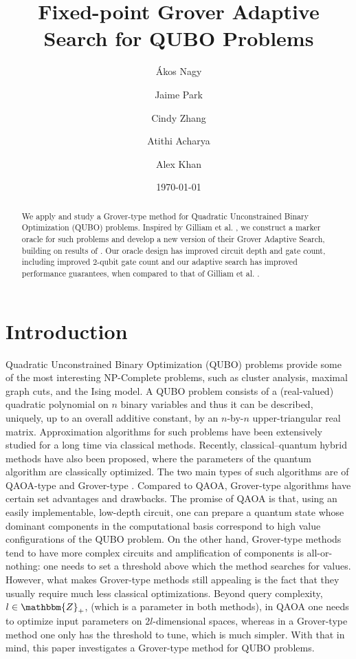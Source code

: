 \documentclass[reqno, 12pt]{amsart}
\title{Fixed-point Grover Adaptive Search for QUBO Problems}
\date{\today}
\author{\'Akos Nagy}
\author{Jaime Park}
\author{Cindy Zhang}
\author{Atithi Acharya}
\author{Alex Khan}
\numberwithin{equation}{section}                %
\def\Z{\mathbbm{Z}}
\begin{document}
\begin{abstract}
   We apply and study a Grover-type method for Quadratic Unconstrained Binary Optimization (QUBO) problems. Inspired by Gilliam et al. \cite{gilliam_grover_2021}, we construct a marker oracle for such problems and develop a new version of their Grover Adaptive Search, building on results of \cites{yoder_fixed_2014,li_quantum_2019}. Our oracle design has improved circuit depth and gate count, including improved $2$-qubit gate count and our adaptive search has improved performance guarantees, when compared to that of Gilliam et al. \cite{gilliam_grover_2021}.
\end{abstract}

\maketitle

\section{Introduction}

Quadratic Unconstrained Binary Optimization (QUBO) problems provide some of the most interesting NP-Complete problems, such as cluster analysis, maximal graph cuts, and the Ising model. A QUBO problem consists of a (real-valued) quadratic polynomial on $n$ binary variables and thus it can be described, uniquely, up to an overall additive constant, by an $n$-by-$n$ upper-triangular real matrix. Approximation algorithms for such problems have been extensively studied for a long time via classical methods. Recently, classical--quantum hybrid methods have also been proposed, where the parameters of the quantum algorithm are classically optimized. The two main types of such algorithms are of QAOA-type \cites{farhi_quantum_2014,szegedy_qaoa_2019,bartschi_grover_2020,golden_threshold_2021} and Grover-type \cite{gilliam_grover_2021}. Compared to QAOA, Grover-type algorithms have certain set advantages and drawbacks. The promise of QAOA is that, using an easily implementable, low-depth circuit, one can prepare a quantum state whose dominant components in the computational basis correspond to high value configurations of the QUBO problem. On the other hand, Grover-type methods tend to have more complex circuits and amplification of components is all-or-nothing: one needs to set a threshold above which the method searches for values. However, what makes Grover-type methods still appealing is the fact that they usually require much less classical optimizations. Beyond query complexity, $l \in \Z_+$, (which is a parameter in both methods), in QAOA one needs to optimize input parameters on $2 l$-dimensional spaces, whereas in a Grover-type method one only has the threshold to tune, which is much simpler. With that in mind, this paper investigates a Grover-type method for QUBO problems.
\end{document}
